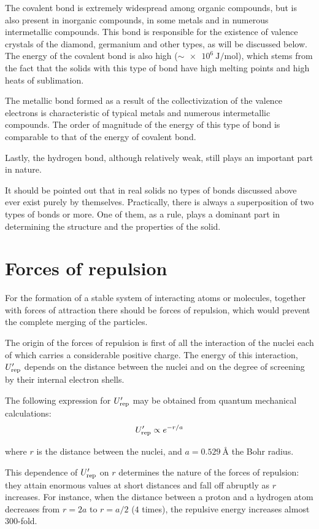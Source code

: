 The covalent bond is extremely widespread among organic compounds, but is also present in inorganic compounds, in some metals and in numerous intermetallic compounds. This bond is responsible for the existence of valence crystals of the diamond, germanium and other types, as will be discussed below. The energy of the covalent bond is also high ($\sim\!\SI{e6}{\joule\per\mole}$), which stems from the fact that the solids with this type of bond have high melting points and high heats of sublimation.

The metallic bond formed as a result of the collectivization of the valence electrons is characteristic of typical metals and numerous intermetallic compounds. The order of magnitude of the energy of this type of bond is comparable to that of the energy of covalent bond.

Lastly, the hydrogen bond, although relatively weak, still plays an important part in nature.

It should be pointed out that in real solids no types of bonds discussed above ever exist purely by themselves. Practically, there is always a superposition of two types of bonds or more. One of them, as a rule, plays a dominant part in determining the structure and the properties of the solid.

\section{Forces of repulsion}\label{sec:7}

For the formation of a stable system of interacting atoms or molecules, together with forces of attraction there should be forces of repulsion, which would prevent the complete merging of the particles.

The origin of the forces of repulsion is first of all the interaction of the nuclei each of which carries a considerable positive charge. The energy of this interaction, $U_{\text{rep}}'$ depends on the distance between the nuclei and on the degree of screening by their internal electron shells.

The following expression for $U_{\text{rep}}'$ may be obtained from quantum mechanical calculations:
\begin{equation}\label{eq:1_14}
	U_{\text{rep}}' \propto e^{-r/a}
\end{equation}

\noindent
where $r$ is the distance between the nuclei, and $a=\SI{0.529}{\angstrom}$ the Bohr radius.

This dependence of $U_{\text{rep}}'$ on $r$ determines the nature of the forces of repulsion: they attain enormous values at short distances and
fall off abruptly as $r$ increases. For instance, when the distance between a proton and a hydrogen atom decreases from $r=2a$ to $r=a/2$ ($4$ times), the repulsive energy increases almost $300$-fold.

